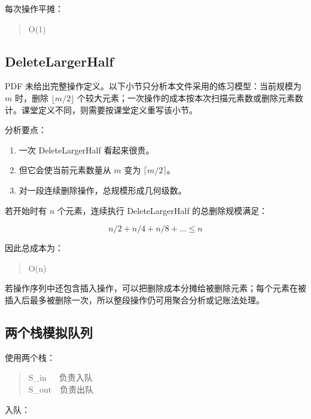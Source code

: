 \documentclass[UTF8,zihao=-4]{ctexart}
\begin{document}
每次操作平摊：

\begin{quote}
\small\ttfamily\raggedright
\relax O(1)\\
\end{quote}

\subsection*{DeleteLargerHalf}

PDF 未给出完整操作定义。以下小节只分析本文件采用的练习模型：当前规模为 $m$ 时，删除 $\lfloor m/2 \rfloor$ 个较大元素；一次操作的成本按本次扫描元素数或删除元素数计。课堂定义不同，则需要按课堂定义重写该小节。

分析要点：

\begin{enumerate}
\item 一次 DeleteLargerHalf 看起来很贵。
\item 但它会使当前元素数量从 $m$ 变为 $\lceil m/2 \rceil$。
\item 对一段连续删除操作，总规模形成几何级数。
\end{enumerate}

若开始时有 $n$ 个元素，连续执行 DeleteLargerHalf 的总删除规模满足：

\[n/2 + n/4 + n/8 + ... \le  n\]

因此总成本为：

\begin{quote}
\small\ttfamily\raggedright
\relax O(n)\\
\end{quote}

若操作序列中还包含插入操作，可以把删除成本分摊给被删除元素；每个元素在被插入后最多被删除一次，所以整段操作仍可用聚合分析或记账法处理。

\subsection*{两个栈模拟队列}

使用两个栈：

\begin{quote}
\small\ttfamily\raggedright
\relax S\_in\ \ \ 负责入队\\
\relax S\_out\ \ 负责出队\\
\end{quote}

入队：
\end{document}
